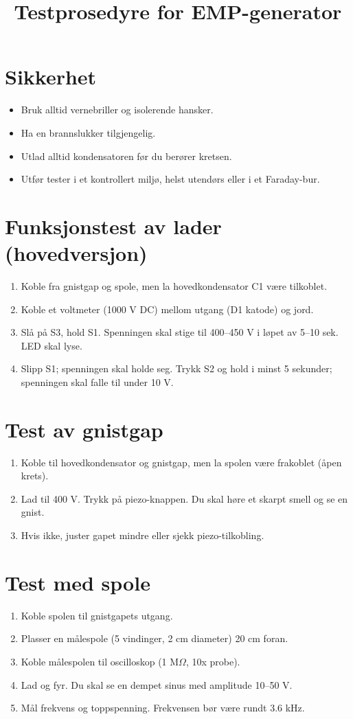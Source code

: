 \documentclass{article}
\title{Testprosedyre for EMP-generator}
\author{}
\date{}
\begin{document}
\maketitle

\section{Sikkerhet}
\begin{itemize}
\item Bruk alltid vernebriller og isolerende hansker.
\item Ha en brannslukker tilgjengelig.
\item Utlad alltid kondensatoren før du berører kretsen.
\item Utfør tester i et kontrollert miljø, helst utendørs eller i et Faraday-bur.
\end{itemize}

\section{Funksjonstest av lader (hovedversjon)}
\begin{enumerate}
\item Koble fra gnistgap og spole, men la hovedkondensator C1 være tilkoblet.
\item Koble et voltmeter (1000 V DC) mellom utgang (D1 katode) og jord.
\item Slå på S3, hold S1. Spenningen skal stige til 400–450 V i løpet av 5–10 sek. LED skal lyse.
\item Slipp S1; spenningen skal holde seg. Trykk S2 og hold i minst 5 sekunder; spenningen skal falle til under 10 V.
\end{enumerate}

\section{Test av gnistgap}
\begin{enumerate}
\item Koble til hovedkondensator og gnistgap, men la spolen være frakoblet (åpen krets).
\item Lad til 400 V. Trykk på piezo-knappen. Du skal høre et skarpt smell og se en gnist.
\item Hvis ikke, juster gapet mindre eller sjekk piezo-tilkobling.
\end{enumerate}

\section{Test med spole}
\begin{enumerate}
\item Koble spolen til gnistgapets utgang.
\item Plasser en målespole (5 vindinger, 2 cm diameter) 20 cm foran.
\item Koble målespolen til oscilloskop (1 M$\Omega$, 10x probe).
\item Lad og fyr. Du skal se en dempet sinus med amplitude 10–50 V.
\item Mål frekvens og toppspenning. Frekvensen bør være rundt 3.6 kHz.
\end{enumerate}
\end{document}
